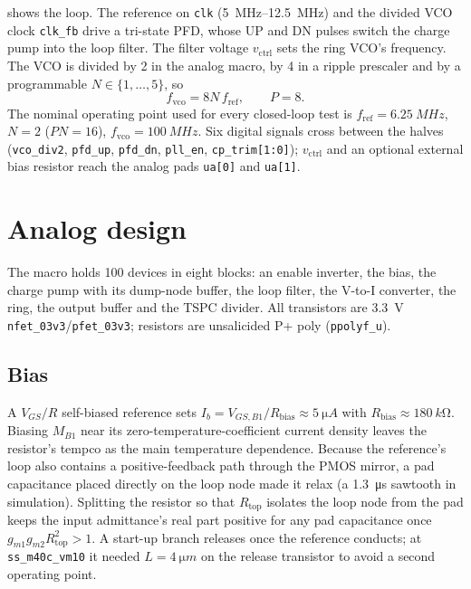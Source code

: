 \documentclass[10pt,twocolumn,letterpaper]{article}
\newcommand{\code}[1]{\texttt{\small #1}}
\begin{document}
 shows the loop. The reference on \code{clk}
(\SIrange{5}{12.5}{MHz}) and the divided VCO clock \code{clk\_fb} drive a
tri-state PFD, whose UP and DN pulses switch the charge pump into the loop
filter. The filter voltage $v_\text{ctrl}$ sets the ring VCO's frequency.
The VCO is divided by 2 in the analog macro, by 4 in a ripple prescaler and
by a programmable $N\in\{1,\dots,5\}$, so
\begin{equation}
  f_\text{vco} = 8N\,f_\text{ref},\qquad P = 8.
\end{equation}
The nominal operating point used for every closed-loop test is
$f_\text{ref} = \SI{6.25}{MHz}$, $N=2$ ($PN=16$), $f_\text{vco} =
\SI{100}{MHz}$. Six digital signals cross between the halves
(\code{vco\_div2}, \code{pfd\_up}, \code{pfd\_dn}, \code{pll\_en},
\code{cp\_trim[1:0]}); $v_\text{ctrl}$ and an optional external bias
resistor reach the analog pads \code{ua[0]} and \code{ua[1]}.

\section{Analog design}\label{sec:analog}
The macro holds 100 devices in eight blocks: an enable inverter, the bias,
the charge pump with its dump-node buffer, the loop filter, the V-to-I
converter, the ring, the output buffer and the TSPC divider. All
transistors are \SI{3.3}{V} \code{nfet\_03v3}/\code{pfet\_03v3}; resistors
are unsalicided P+ poly (\code{ppolyf\_u}).

\subsection{Bias}
A $V_{GS}/R$ self-biased reference sets $I_b = V_{GS,B1}/R_\text{bias}
\approx \SI{5}{\micro A}$ with $R_\text{bias}\approx\SI{180}{k\ohm}$.
Biasing $M_{B1}$ near its zero-temperature-coefficient current density
leaves the resistor's tempco as the main temperature dependence. Because
the reference's loop also contains a positive-feedback path through the
PMOS mirror, a pad capacitance placed directly on the loop node made it
relax (a \SI{1.3}{\micro s} sawtooth in simulation). Splitting the resistor
so that $R_\text{top}$ isolates the loop node from the pad keeps the input
admittance's real part positive for any pad capacitance once
$g_{m1}g_{m2}R_\text{top}^2 > 1$. A start-up branch releases once the
reference conducts; at \code{ss\_m40c\_vm10} it needed $L=\SI{4}{\micro m}$
on the release transistor to avoid a second operating point.
\end{document}

